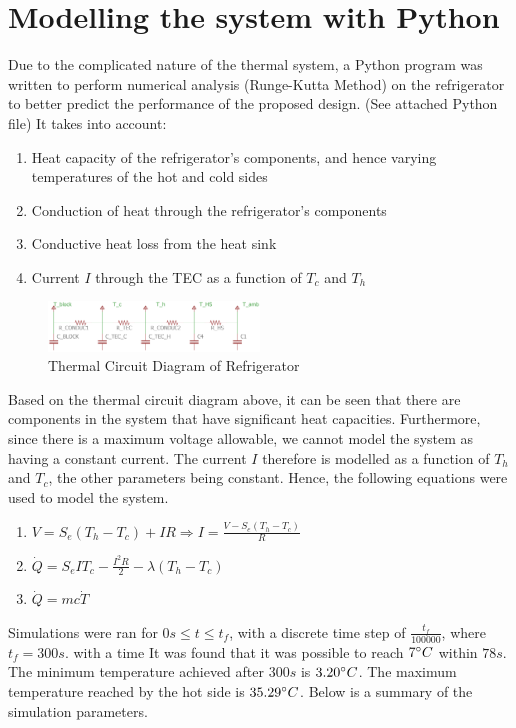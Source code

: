 \documentclass[12pt,a4paper]{IEEEtran}
\begin{document}
	\section{Modelling the system with Python}
	Due to the complicated nature of the thermal system, a Python program was written to perform numerical analysis (Runge-Kutta Method) on the refrigerator to better predict the performance of the proposed design. (See attached Python file) It takes into account:
	\begin{enumerate}
		\item Heat capacity of the refrigerator's components, and hence varying temperatures of the hot and cold sides
		\item Conduction of heat through the refrigerator's components
		\item Conductive heat loss from the heat sink
		\item Current $I$ through the TEC as a function of $T_c$ and $T_h$
	\end{enumerate}\par
	\begin{figure}[H]
		\begin{center}
			\includegraphics[width=0.5\textwidth]{thermal_circuit.png}
			\caption{Thermal Circuit Diagram of Refrigerator}
			\label{fig:thermalCurcuit}
		\end{center}
	\end{figure}
	Based on the thermal circuit diagram above, it can be seen that there are components in the system that have significant heat capacities. Furthermore, since there is a maximum voltage allowable, we cannot model the system as having a constant current. The current $I$ therefore is modelled as a function of $T_h$ and $T_c$, the other parameters being constant. Hence, the following equations were used to model the system.
	\begin{enumerate}
	\item $V=S_e (T_h-T_c )+IR \Rightarrow I = \frac{V-S_e(T_h-T_c)}{R}$
	\item $\dot{Q} = S_e I T_c - \frac{I^2R}{2} - \lambda (T_h - T_c)$
	\item $ \dot{Q} = mc\dot{T}$
	\end{enumerate}
	
	Simulations were ran for $0s \leq t \leq t_f$, with a discrete time step of $\frac{t_f}{100000}$, where $t_f = 300s$. with a time  It was found that it was possible to reach $7 \degree C$ within $78s$. The minimum temperature achieved after $300s$ is $3.20\degree C$. The maximum temperature reached by the hot side is $35.29 \degree C$. Below is a summary of the simulation parameters.
	
\end{document}
